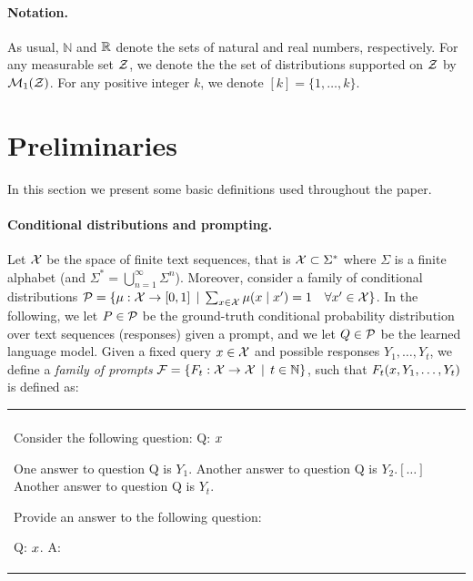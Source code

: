 \documentclass[a4paper]{article}
\theoremstyle{plain}
\theoremstyle{definition}
\theoremstyle{plain}
\begin{document}
\paragraph{Notation.} As usual, $\mathbb N$ and ${\mathbb{R}}$ denote the sets of natural and real numbers, respectively. For any measurable set $\mathcal{Z}$, we denote the the set of distributions supported on $\mathcal{Z}$ by ${\mathcal{M}}_1(\mathcal{Z})$. For any positive integer $k$, we denote $[k]=\{1,\ldots,k\}$.

\section{Preliminaries}
\label{sec:prelim}
%
In this section we present some basic definitions used throughout the paper.

\paragraph{Conditional distributions and prompting.}
Let ${\mathcal{X}}$ be the space of finite text sequences, that is ${\mathcal{X}} \subset \Sigma^*$ where $\Sigma$ is a finite alphabet (and $\Sigma^* = \bigcup_{n=1}^\infty \Sigma^n$).
Moreover, consider a family of conditional distributions
${\mathcal{P}} = \{\mu : {\mathcal{X}} \to [0,1] \, \mid \, \sum_{x \in {\mathcal{X}}} \mu(x \mid x') = 1 \quad \forall x' \in {\mathcal{X}}\}$.
%
In the following, we let $P \in {\mathcal{P}}$ be the ground-truth conditional probability distribution over text sequences (responses) given a prompt, and we let $Q \in {\mathcal{P}}$ be the learned language model.
%
Given a fixed query $x \in {\mathcal{X}}$ and possible responses $Y_1,\ldots, Y_t$, we define a \emph{family of prompts} $\mathcal{F} = \{F_t : {\mathcal{X}} \to {\mathcal{X}} \,\mid\, t \in \mathbb{N}\}$, such that
$F_t(x,Y_1,\ldots,Y_{t})$ is defined as:

{%
\begin{center}
\begin{tabularx}{10cm} { 
  | >{\raggedright\arraybackslash} X | }
\hline\\[-0.3em]
Consider the following question:
Q: $x$

One answer to question Q is $Y_1$. Another answer to question Q is $Y_2. [\ldots]$
Another answer to question Q is $Y_t$.

Provide an answer to the following question:

Q: $x$. A: 

\\[-0.3em]
\hline
\end{tabularx}
\end{center}
}
%
\end{document}
